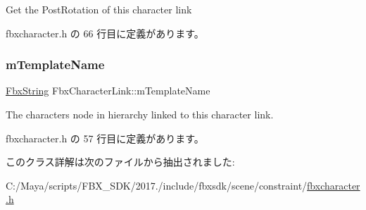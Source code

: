 Get the Post\+Rotation of this character link 



 fbxcharacter.\+h の 66 行目に定義があります。

\mbox{\label{class_fbx_character_link_a57e20720f9a533670e5b003f9a3d05f2}} 
\subsubsection{\texorpdfstring{m\+Template\+Name}{mTemplateName}}
{\footnotesize\ttfamily \hyperlink{class_fbx_string}{Fbx\+String} Fbx\+Character\+Link\+::m\+Template\+Name}



The character\textquotesingle{}s node in hierarchy linked to this character link. 



 fbxcharacter.\+h の 57 行目に定義があります。



このクラス詳解は次のファイルから抽出されました\+:\begin{DoxyCompactItemize}
\item 
C\+:/\+Maya/scripts/\+F\+B\+X\+\_\+\+S\+D\+K/2017./include/fbxsdk/scene/constraint/\hyperlink{fbxcharacter_8h}{fbxcharacter.\+h}\end{DoxyCompactItemize}
